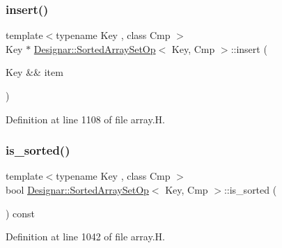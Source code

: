 \subsubsection{\texorpdfstring{insert()}{insert()}\hspace{0.1cm}{\footnotesize\ttfamily [2/2]}}
{\footnotesize\ttfamily template$<$typename Key , class Cmp $>$ \\
Key $\ast$ \hyperlink{class_designar_1_1_sorted_array_set_op}{Designar\+::\+Sorted\+Array\+Set\+Op}$<$ Key, Cmp $>$\+::insert (\begin{DoxyParamCaption}\item[{Key \&\&}]{item }\end{DoxyParamCaption})}



Definition at line 1108 of file array.\+H.

\mbox{\label{class_designar_1_1_sorted_array_set_op_aa11c07509319e513a6f8dd0f3ab7663a}} 
\subsubsection{\texorpdfstring{is\+\_\+sorted()}{is\_sorted()}}
{\footnotesize\ttfamily template$<$typename Key , class Cmp $>$ \\
bool \hyperlink{class_designar_1_1_sorted_array_set_op}{Designar\+::\+Sorted\+Array\+Set\+Op}$<$ Key, Cmp $>$\+::is\+\_\+sorted (\begin{DoxyParamCaption}{ }\end{DoxyParamCaption}) const\hspace{0.3cm}{\ttfamily [inline]}}



Definition at line 1042 of file array.\+H.

\mbox{\label{class_designar_1_1_sorted_array_set_op_a27beb3e6b8f6b83c6efa46c38e8d22f9}} 
